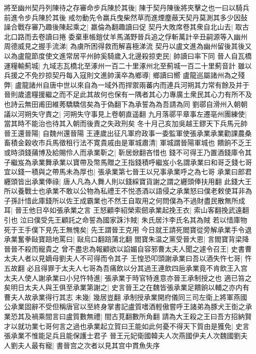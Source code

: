 將至幽州契丹列陳待之存審命步兵陳於其後|{
	陳于契丹陳後將夾擊之也一曰以騎兵前進令步兵陳於其後}
戒勿動先令羸兵曳柴然草而進煙塵蔽天契丹莫測其多少因鼔譟合戰存審乃趣後陳起乘之|{
	羸倫為翻趣讀曰促}
契丹大敗席卷其衆自北山去|{
	取古北口路而去卷讀曰捲}
委棄車帳鎧仗羊馬滿野晉兵追之俘斬萬計辛丑嗣源等入幽州周德威見之握手流涕|{
	為虜所困得救而解喜極涕流}
契丹以盧文進為幽州留後其後又以為盧龍節度使文進常居平州帥奚騎歲入北邊殺掠吏民|{
	帥讀曰率下同}
晉人自瓦橋運糧輸薊城|{
	九域志瓦橋北至涿州一百二十里涿州北至薊城一百二十里薊音計}
雖以兵援之不免抄掠契丹每入寇則文進帥漢卒為鄉導|{
	鄉讀曰嚮}
盧龍巡屬諸州為之殘弊|{
	盧龍諸州自唐中世以來自為一域外而捍禦兩蕃内而連兵河朔其力常有餘及并于晉則歲遣糧援繼之而不足此其故何也保有一隅者其心力專廣土衆民其心力有所不及也詩云無田甫田維莠驕驕信矣為于偽翻下為承誓為為吾請為同}
劉鄩自滑州入朝朝議以河朔失守責之|{
	河朔失守事見上卷朝直遥翻}
九月落鄩平章事左遷亳州團練使|{
	當其時不能治也待其入朝而後責之失政刑矣}
冬十月己亥加吳越王鏐天下兵馬元帥　晉王還晉陽|{
	自魏州還晉陽}
王連歲出征凡軍府政事一委監軍使張承業承業勸課農桑畜積金穀收市兵馬徵租行法不寛貴戚由是軍城肅清|{
	軍城謂晉陽軍城也}
饋餉不乏王或時須錢蒱博及給賜伶人而承業靳之|{
	靳居焮翻吝惜也}
錢不可得王乃置酒錢庫令其子繼岌為承業舞承業以寶帶及幣馬贈之王指錢積呼繼岌小名謂承業曰和哥乏錢七哥宜以錢一積與之帶馬未為厚也|{
	張承業第七晉王以兄事承業呼之為七哥}
承業曰郎君纒頭皆出承業俸祿|{
	唐人凡為人舞人則以錢綵寶貨謝之謂之纒頭俸扶用翻}
此錢大王所以養戰士也承業不敢以公物為私禮王不悦憑酒以語侵之承業怒曰僕老敕使耳非為子孫計惜此庫錢所以佐王成霸業也不然王自取用之何問僕為不過財盡民散無所成耳|{
	晉王他日卒如張承業之言}
王怒顧李紹榮索劒承業起挽王衣|{
	索山客翻挽武遠翻引也}
泣曰僕受先王顧託之命誓為國家誅汴賊|{
	朱氏居汴李氏名其為賊}
若以惜庫物死于王手僕下見先王無愧矣|{
	先王謂晉王克用}
今日就王請死閻寶從旁解承業手令退承業奮拳敺寶踣地罵曰|{
	敺烏口翻踣蒲北翻}
閻寶朱温之黨受晉大恩|{
	言閻寶背梁降晉晉不殺而寵貴之}
曾不盡忠為報顧欲以諂媚自容邪曹太夫人聞之遽令召王|{
	史書曹太夫人者以見嫡母劉夫人不可得而令其子}
王惶恐叩頭謝承業曰吾以酒失忤七哥|{
	忤五故翻}
必且得罪于太夫人七哥為吾痛飲以分其過王連飲四巵承業竟不肯飲王入宫太夫人使人謝承業曰小兒忤特進|{
	張承業于時官特進意亦晉王承制授之也}
適已笞之矣明日太夫人與王俱至承業第謝之|{
	史言晉王之在魏皆張承業足饋餉以輔之亦内有曹夫人故承業得行其志}
未幾|{
	幾居豈翻}
承制授承業開府儀同三司左衛上將軍燕國公承業固辭不受但稱唐官以至終身掌書記盧質嗜酒輕傲嘗呼王諸弟為豚犬王衘之承業恐其及禍乘間言曰盧質數無禮|{
	間古莧翻數所角翻}
請為大王殺之王曰吾方招納賢才以就功業七哥何言之過也承業起立賀曰王能如此何憂不得天下質由是獲免|{
	史言張承業不惟能足兵且能保護士君子}
晉王元妃衛國韓夫人次燕國伊夫人次魏國劉夫人劉夫人最有寵|{
	書晉宫之次者以見其宫中貫魚失序}
